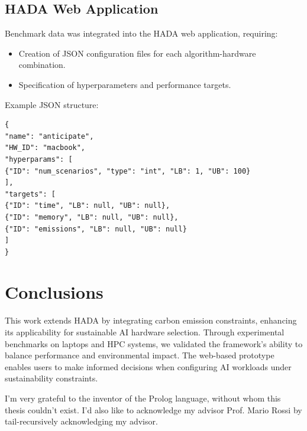 \documentclass[a4paper,singleside,12pt]{report} %
\begin{document}
\section{HADA Web Application}
Benchmark data was integrated into the HADA web application, requiring:
\begin{itemize}
\item Creation of JSON configuration files for each algorithm-hardware combination.
\item Specification of hyperparameters and performance targets.
\end{itemize}

Example JSON structure:
\begin{verbatim}
{
"name": "anticipate",
"HW_ID": "macbook",
"hyperparams": [
{"ID": "num_scenarios", "type": "int", "LB": 1, "UB": 100}
],
"targets": [
{"ID": "time", "LB": null, "UB": null},
{"ID": "memory", "LB": null, "UB": null},
{"ID": "emissions", "LB": null, "UB": null}
]
}
\end{verbatim}

\chapter{Conclusions}

This work extends HADA by integrating carbon emission constraints, enhancing its applicability 
for sustainable AI hardware selection. Through experimental benchmarks on laptops and HPC systems, 
we validated the framework’s ability to balance performance and environmental impact. The web-based prototype 
enables users to make informed decisions when configuring AI workloads under sustainability constraints.

\appendix

\printbibliography[heading=bibintoc] %

\acknowledgements
I'm very grateful to the inventor of the Prolog language, without whom this thesis couldn't exist. I'd also like 
to acknowledge my advisor Prof. Mario Rossi by tail-recursively acknowledging my advisor.
	
\end{document}
